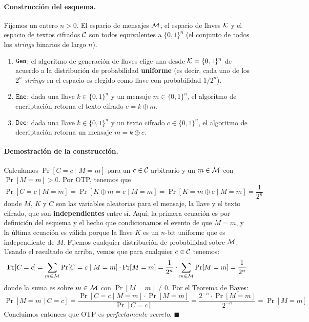 \paragraph*{Construcción del esquema.} Fijemos un entero $n > 0$. El espacio de mensajes $\mathcal{M}$, el espacio de llaves $\mathcal{K}$ y el espacio de textos cifrados $\mathcal{C}$ son todos equivalentes a $\{0,1\}^n$ (el conjunto de todos los \textit{strings} binarios de largo $n$).
\begin{enumerate}
    \item $\texttt{Gen}$: el algoritmo de generación de llaves elige una desde $\mathcal{K} = \{0,1\}^n$ de acuerdo a la distribución de probabilidad \textbf{uniforme} (es decir, cada uno de los $2^n$ \textit{strings} en el espacio es elegido como llave con probabilidad $1/2^n$).
    \item $\texttt{Enc}$: dada una llave $k \in \{0,1\}^n$ y un mensaje $m \in \{0,1\}^n$, el algoritmo de encriptación retorna el texto cifrado $c = k \oplus m$.
    \item $\texttt{Dec}$: dada una llave $k \in \{0,1\}^n$ y un texto cifrado $c \in \{0,1\}^n$, el algoritmo de decriptación retorna un mensaje $m = k \oplus c$.
\end{enumerate}

\paragraph*{Demostración de la construcción.} Calculamos $\Pr[C = c \mid M = m]$ para un $c \in \mathcal{C}$ arbitrario y un $m \in \mathcal{M}$ con $\Pr[M = m] > 0$. Por OTP, tenemos que
$$
    \Pr[C = c \mid M = m] = \Pr[K \oplus m = c \mid M = m] = \Pr[K = m \oplus c \mid M = m] = \frac{1}{2^n}
$$
donde $M$, $K$ y $C$ son las variables aleatorias para el mensaje, la llave y el texto cifrado, que son \textbf{independientes} entre sí. Aquí, la primera ecuación es por definición del esquema y el hecho que condicionamos el evento de que $M = m$, y la última ecuación es válida porque la llave $K$ es un $n$-bit uniforme  que es independiente de $M$. Fijemos cualquier distribución de probabilidad sobre $\mathcal{M}$. Usando el resultado de arriba, vemos que para cualquier $c \in \mathcal{C}$ tenemos:
$$
    \Pr[C = c] = \sum_{m \in \mathcal{M}} \Pr[C = c \mid M = m]\cdot \Pr[M = m] = \frac{1}{2^n} \cdot \sum_{m \in \mathcal{M}} \Pr[M = m] = \frac{1}{2^n}
$$
donde la suma es sobre $m \in \mathcal{M}$ con $\Pr[M = m] \neq 0$. Por el Teorema de Bayes:
$$
    \Pr[M = m \mid C = c] = \frac{\Pr[C = c \mid M = m] \cdot \Pr[M = m]}{\Pr[C = c]} = \frac{2^{-n} \cdot \Pr[M = m]}{2^{-n}} = \Pr[M = m]
$$
Concluimos entonces que OTP es \textit{perfectamente secreto}. \hfill $\blacksquare$

